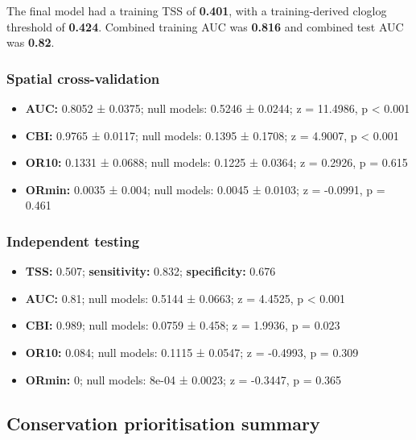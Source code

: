 \documentclass[
  openany]{book}
\providecommand{\tightlist}{%
  \setlength{\itemsep}{0pt}\setlength{\parskip}{0pt}}
\providecommand{\tightlist}{%
  \setlength{\itemsep}{0pt}%
  \setlength{\parskip}{0pt}%
}
\begin{document}
The final model had a training TSS of \textbf{0.401}, with a training-derived cloglog threshold of \textbf{0.424}. Combined training AUC was \textbf{0.816} and combined test AUC was \textbf{0.82}.

\subsubsection*{Spatial cross-validation}\label{spatial-cross-validation-17}

\begin{itemize}
\tightlist
\item
  \textbf{AUC:} 0.8052 ± 0.0375; null models: 0.5246 ± 0.0244; z = 11.4986, p \textless{} 0.001
\item
  \textbf{CBI:} 0.9765 ± 0.0117; null models: 0.1395 ± 0.1708; z = 4.9007, p \textless{} 0.001
\item
  \textbf{OR10:} 0.1331 ± 0.0688; null models: 0.1225 ± 0.0364; z = 0.2926, p = 0.615
\item
  \textbf{ORmin:} 0.0035 ± 0.004; null models: 0.0045 ± 0.0103; z = -0.0991, p = 0.461
\end{itemize}

\subsubsection*{Independent testing}\label{independent-testing-17}

\begin{itemize}
\tightlist
\item
  \textbf{TSS:} 0.507; \textbf{sensitivity:} 0.832; \textbf{specificity:} 0.676
\item
  \textbf{AUC:} 0.81; null models: 0.5144 ± 0.0663; z = 4.4525, p \textless{} 0.001
\item
  \textbf{CBI:} 0.989; null models: 0.0759 ± 0.458; z = 1.9936, p = 0.023
\item
  \textbf{OR10:} 0.084; null models: 0.1115 ± 0.0547; z = -0.4993, p = 0.309
\item
  \textbf{ORmin:} 0; null models: 8e-04 ± 0.0023; z = -0.3447, p = 0.365
\end{itemize}

\subsection*{Conservation prioritisation summary}\label{conservation-prioritisation-summary-17}
\end{document}
